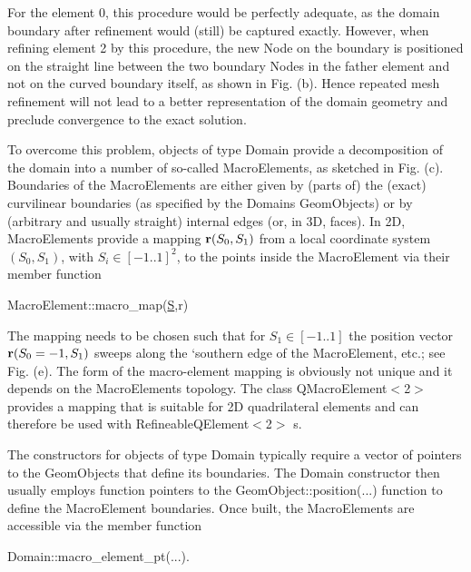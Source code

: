  For the element 0, this procedure would be perfectly adequate, as the domain boundary after refinement would (still) be captured exactly. However, when refining element 2 by this procedure, the new {\ttfamily Node} on the boundary is positioned on the straight line between the two boundary {\ttfamily Nodes} in the father element and not on the curved boundary itself, as shown in Fig. (b). Hence repeated mesh refinement will not lead to a better representation of the domain geometry and preclude convergence to the exact solution.

To overcome this problem, objects of type {\ttfamily Domain} provide a decomposition of the domain into a number of so-\/called {\ttfamily Macro\+Elements}, as sketched in Fig. (c). Boundaries of the {\ttfamily Macro\+Elements} are either given by (parts of) the (exact) curvilinear boundaries (as specified by the {\ttfamily Domain\textquotesingle{}s} {\ttfamily Geom\+Objects}) or by (arbitrary and usually straight) internal edges (or, in 3D, faces). In 2D, {\ttfamily Macro\+Elements} provide a mapping $ {\bf r}(S_0,S_1) $ from a local coordinate system $ (S_0, S_1) $, with $ S_i \in [-1..1]^2 $, to the points inside the {\ttfamily Macro\+Element} via their member function 
\begin{DoxyCode}
MacroElement::macro\_map(\hyperlink{namespaceoomph_1_1QuadTreeNames_a8954a5947b19986b8c4b755bc7639f7da85b07d6c087e0cb66bac32a0b6a45198}{S},r) 
\end{DoxyCode}
 The mapping needs to be chosen such that for $ S_1\in [-1..1]$ the position vector $ {\bf r}(S_0=-1,S_1) $ sweeps along the `southern\textquotesingle{} edge of the {\ttfamily Macro\+Element}, etc.; see Fig. (e). The form of the macro-\/element mapping is obviously not unique and it depends on the {\ttfamily Macro\+Element\textquotesingle{}s} topology. The class {\ttfamily Q\+Macro\+Element$<$2$>$} provides a mapping that is suitable for 2D quadrilateral elements and can therefore be used with {\ttfamily Refineable\+Q\+Element$<$2$>$} s.

The constructors for objects of type {\ttfamily Domain} typically require a vector of pointers to the {\ttfamily Geom\+Objects} that define its boundaries. The {\ttfamily Domain} constructor then usually employs function pointers to the {\ttfamily Geom\+Object\+::position}(...) function to define the {\ttfamily Macro\+Element} boundaries. Once built, the {\ttfamily Macro\+Elements} are accessible via the member function
\begin{DoxyCode}
Domain::macro\_element\_pt(...). 
\end{DoxyCode}


